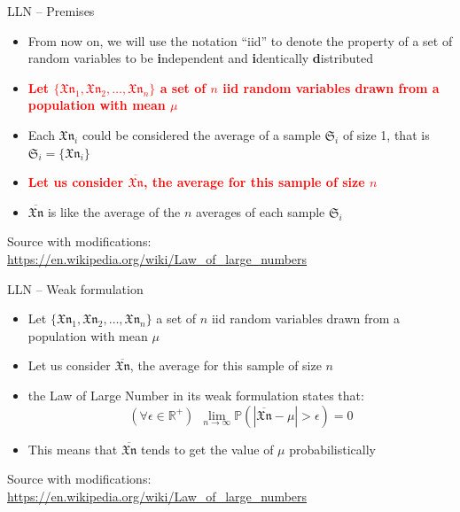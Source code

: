 \documentclass{beamer}
\begin{document}
\begin{frame}
{\centerline{LLN -- Premises}}

\begin{itemize}
\item From now on, we will use the notation ``iid'' to denote the property of a set of random variables to be \textbf{ i}ndependent and \textbf{ i}dentically \textbf{ d}istributed
\item \textcolor{red}{ \bf Let $\{ \mathfrak{Xn}_1, \mathfrak{Xn}_2, \ldots{}, \mathfrak{Xn}_n\}$ a set of $n$ iid random variables drawn from a population with mean $\mu$}
\item Each $\mathfrak{Xn}_i$ could be considered the average of a sample $\mathfrak{S}_i$ of size 1, that is $\mathfrak{S}_i = \{ \mathfrak{Xn}_i \}$
\item \textcolor{red}{ \bf Let us consider $\overline{\mathfrak{Xn}}$, the average for this sample of size $n$ }
\item $\overline{\mathfrak{Xn}}$ is like the average of the $n$ averages of each sample $\mathfrak{S}_i$
\end{itemize}

\begin{center}
\tiny 
Source with modifications: \url{https://en.wikipedia.org/wiki/Law_of_large_numbers}
\end{center}
\end{frame}


\begin{frame}
{\centerline{LLN -- Weak formulation}}

\begin{itemize}
\item Let $\{ \mathfrak{Xn}_1, \mathfrak{Xn}_2, \ldots{}, \mathfrak{Xn}_n\}$ a set of $n$ iid random variables drawn from a population with mean $\mu$
\item Let us consider $\overline{\mathfrak{Xn}}$, the average for this sample of size $n$ 
\item the Law of Large Number in its weak formulation states that:
$$(\forall \epsilon \in \mathbb{R}^+) ~~ \lim_{n \to \infty} \mathbb{P} ( | \overline{\mathfrak{Xn}} - \mu |  > \epsilon ) = 0$$
\item This means that $\overline{\mathfrak{Xn}}$ tends to get the value of $\mu$ probabilistically

\end{itemize}

\begin{center}
\tiny 
Source with modifications: \url{https://en.wikipedia.org/wiki/Law_of_large_numbers}
\end{center}
\end{frame}
\end{document}
